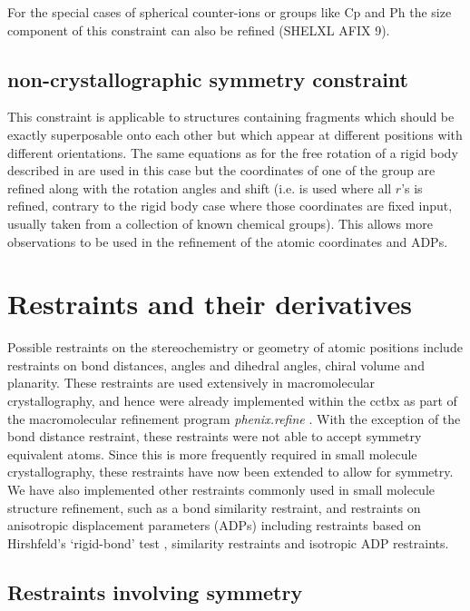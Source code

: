 \documentclass[pdf]{iucr}
\begin{document}
For the special cases of spherical counter-ions or groups like Cp and Ph the size component of this constraint can also be refined (SHELXL AFIX 9).

\subsection{non-crystallographic symmetry constraint}
This constraint is applicable to structures containing fragments which should be exactly superposable onto each other but which appear at different positions with different orientations.
The same equations as for the free rotation of a rigid body described in  are used in this case but the coordinates of one of the group are refined along with the rotation angles and shift (i.e.  is used where all $r$'s is refined, contrary to the rigid body case where those coordinates are fixed input, usually taken from a collection of known chemical groups). This allows more observations to be used in the refinement of the atomic coordinates and ADPs.


\section{Restraints and their derivatives}
\label{appendix:restraints}
Possible restraints on the stereochemistry or geometry of atomic positions include restraints on bond distances, angles and dihedral angles, chiral volume and planarity. These restraints are used extensively in macromolecular crystallography, and hence were already implemented within the cctbx as part of the macromolecular refinement program \emph{phenix.refine} . With the exception of the bond distance restraint, these restraints were not able to accept symmetry equivalent atoms. Since this is more frequently required in small molecule crystallography, these restraints have now been extended to allow for symmetry. We have also implemented other restraints commonly used in small molecule structure refinement, such as a bond similarity restraint, and restraints on anisotropic displacement parameters (ADPs) including restraints based on Hirshfeld's `rigid-bond' test , similarity restraints and isotropic ADP restraints.

\subsection{Restraints involving symmetry}
\end{document}
